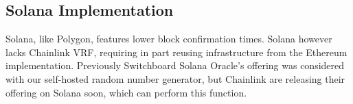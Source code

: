 \subsection{Solana Implementation}

Solana, like Polygon, features lower block confirmation times. Solana however lacks Chainlink VRF, requiring in part reusing infrastructure from the Ethereum implementation. Previously Switchboard Solana Oracle's offering was considered with our self-hosted random number generator, but Chainlink are releasing their offering on Solana soon, which can perform this function.